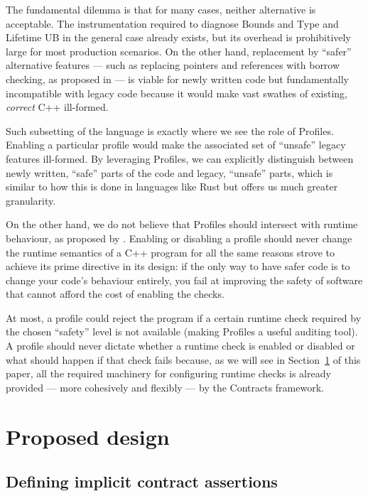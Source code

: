 The fundamental dilemma is that for many cases, neither alternative is acceptable. The instrumentation required to diagnose Bounds and Type and Lifetime UB in the general case already exists, but its overhead is prohibitively large for most production scenarios. On the other hand, replacement by ``safer'' alternative features --- such as replacing pointers and references with borrow checking, as proposed in \cite{P3390R0} --- is viable for newly written code but fundamentally incompatible with legacy code because it would make vast swathes of existing, \emph{correct} C++ ill-formed.

Such subsetting of the language is exactly where we see the role of Profiles. Enabling a particular profile would make the associated set of ``unsafe'' legacy features ill-formed. By leveraging Profiles,
we can explicitly distinguish between newly written, ``safe'' parts of the code and legacy, ``unsafe'' parts, which is similar to how this is done in languages like Rust but offers us much greater granularity.

On the other hand, we do not believe that Profiles should intersect with runtime behaviour, as proposed by  \cite{P3081R1}. Enabling or disabling a profile should never change the runtime semantics of a C++ program for all the same reasons \cite{P2900R14} strove to achieve its prime directive in its design: if the only way to have safer code is to change your code's behaviour entirely, you fail at improving the safety of software that cannot afford the cost of enabling the checks.

At most, a profile could reject the program if a certain runtime check required by the chosen ``safety'' level is not available (making Profiles a useful auditing tool). A profile should never dictate whether a runtime check is enabled or disabled or what should happen if that check fails because, as we will see in Section~\ref{design} of this paper, all the required machinery for configuring runtime checks is already provided --- more cohesively and flexibly --- by the Contracts framework.

\section{Proposed design}
\label{design}

\subsection{Defining implicit contract assertions}
\label{defineicas}

